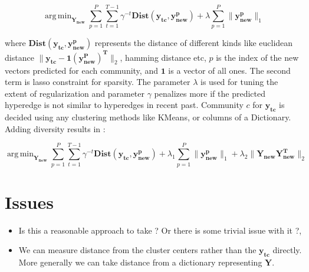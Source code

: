 \documentclass{sig-alternate}
\DeclareMathOperator*{\argmin}{arg\,min}
\begin{document}
\begin{equation}
\argmin_{\mathbf{Y_{new}}}  \sum_{p=1}^{P} \sum_{t=1}^{T-1} \gamma^{-t} \mathbf{Dist(y_{tc},y_{new}^{p})} + \lambda  \sum_{p=1}^{P} \| \mathbf{y_{new}^{p}} \|_{1}
\end{equation}

where $\mathbf{Dist(y_{tc},y_{new}^{p})}$ represents the distance of different kinds like euclidean distance $\| \mathbf{y_{tc}}-\mathbf{1(y_{new}^{P})^T} \|_2$, hamming distance etc, $p$ is the index of the new vectors predicted for each community, and $\mathbf{1}$ is a vector of all ones. The second term is lasso constraint for sparsity. The parameter $\lambda$ is used for tuning the extent of regularization and parameter $\gamma$ penalizes more if the predicted hyperedge is not similar to hyperedges in recent past. Community $c$ for $\mathbf{y_{tc}}$ is decided using any clustering methods like KMeans, or columns of a Dictionary. Adding diversity results in :

\begin{equation}
\argmin_{\mathbf{Y_{new}}}  \sum_{p=1}^{P} \sum_{t=1}^{T-1} \gamma^{-t} \mathbf{Dist(y_{tc},y_{new}^{p})} + \lambda_1  \sum_{p=1}^{P} \| \mathbf{y_{new}^{p}} \|_{1} + \lambda_2 \| \mathbf{Y_{new}Y_{new}^{T}}\|_2
\end{equation}


\section{Issues}

\begin{itemize}
\item{ Is this a reasonable approach to take ? Or there is some trivial issue with it ?,} 
\item {We can measure distance from the cluster centers rather than the $\mathbf{y_{tc}}$ directly. More generally we can take distance from a dictionary representing $\mathbf{Y}$.}
\end{itemize}


%

\end{document}
